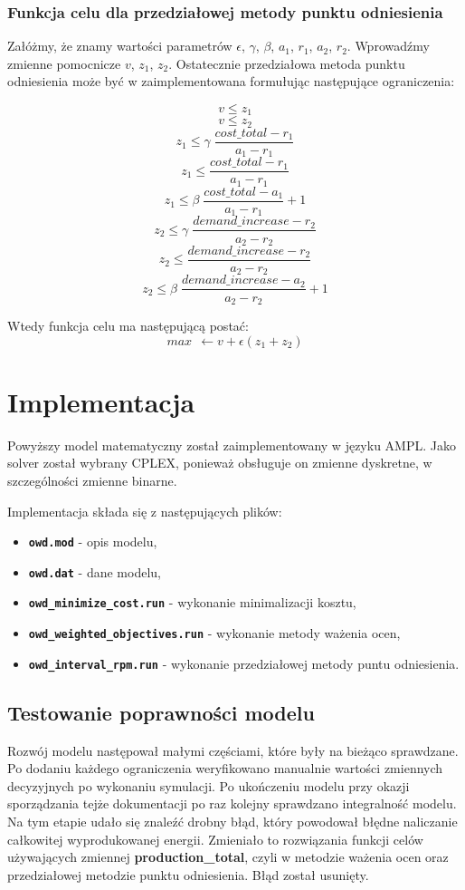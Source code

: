 \documentclass[12pt, twoside, hidelinks, a4paper]{article}
\begin{document}
\subsubsection{Funkcja celu dla przedziałowej metody punktu odniesienia}
Załóżmy, że znamy wartości parametrów $\epsilon$, $\gamma$, $\beta$, $a_1$, $r_1$, $a_2$, $r_2$. Wprowadźmy zmienne pomocnicze $v$, $z_1$, $z_2$. Ostatecznie przedziałowa metoda punktu odniesienia może być w zaimplementowana formułując następujące ograniczenia:

$$v \leqslant z_1$$
$$v \leqslant z_2$$
$$z_1 \leqslant \gamma \; \frac{cost\_total - r_1}{a_1 - r_1}$$
$$z_1 \leqslant \frac{cost\_total - r_1}{a_1 - r_1}$$
$$z_1 \leqslant \beta \; \frac{cost\_total - a_1}{a_1 - r_1} + 1$$
$$z_2 \leqslant \gamma \; \frac{demand\_increase - r_2}{a_2 - r_2}$$
$$z_2 \leqslant \frac{demand\_increase - r_2}{a_2 - r_2}$$
$$z_2 \leqslant \beta \; \frac{demand\_increase - a_2}{a_2 - r_2} + 1$$

Wtedy funkcja celu ma następującą postać:
$$max \: \: \leftarrow v + \epsilon (z_1 + z_2)$$

\section{Implementacja}
Powyższy model matematyczny został zaimplementowany w języku AMPL. Jako solver został wybrany CPLEX, ponieważ obsługuje on zmienne dyskretne, w szczególności zmienne binarne.

Implementacja składa się z następujących plików:
\begin{itemize}
\item \textbf{\texttt{owd.mod}} - opis modelu,
\item \textbf{\texttt{owd.dat}} - dane modelu,
\item \textbf{\texttt{owd\_minimize\_cost.run}} - wykonanie minimalizacji kosztu,
\item \textbf{\texttt{owd\_weighted\_objectives.run}} - wykonanie metody ważenia ocen,
\item \textbf{\texttt{owd\_interval\_rpm.run}} - wykonanie przedziałowej metody puntu odniesienia.
\end{itemize}

\subsection{Testowanie poprawności modelu}
Rozwój modelu następował małymi częściami, które były na bieżąco sprawdzane. Po dodaniu każdego ograniczenia weryfikowano manualnie wartości zmiennych decyzyjnych po wykonaniu symulacji. Po ukończeniu modelu przy okazji sporządzania tejże dokumentacji po raz kolejny sprawdzano integralność modelu. Na tym etapie udało się znaleźć drobny błąd, który powodował błędne naliczanie całkowitej wyprodukowanej energii. Zmieniało to rozwiązania funkcji celów używających zmiennej \textbf{production\_total}, czyli w metodzie ważenia ocen oraz przedziałowej metodzie punktu odniesienia. Błąd został usunięty.
\end{document}
